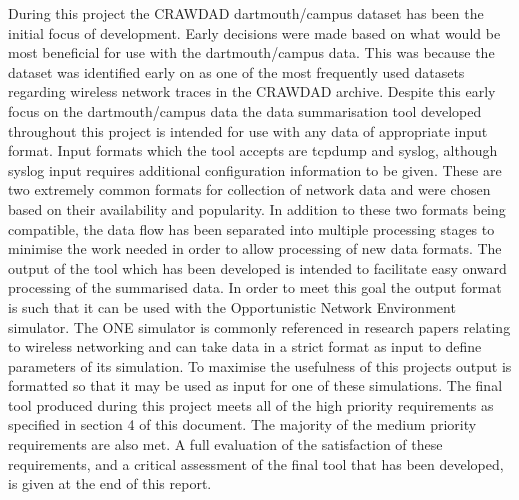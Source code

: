 During this project the CRAWDAD dartmouth/campus dataset \cite{dartmouthcampus2009} has been the initial focus of development. Early decisions were made based on what would be most beneficial for use with the dartmouth/campus data. This was because the dataset was identified early on as one of the most frequently used datasets regarding wireless network traces in the CRAWDAD archive. Despite this early focus on the dartmouth/campus data the data summarisation tool developed throughout this project is intended for use with any data of appropriate input format. Input formats which the tool accepts are tcpdump and syslog, although syslog input requires additional configuration information to be given. These are two extremely common formats for collection of network data and were chosen based on their availability and popularity. In addition to these two formats being compatible, the data flow has been separated into multiple processing stages to minimise the work needed in order to allow processing of new data formats.
The output of the tool which has been developed is intended to facilitate easy onward processing of the summarised data. In order to meet this goal the output format is such that it can be used with the Opportunistic Network Environment simulator. The ONE simulator is commonly referenced in research papers relating to wireless networking and can take data in a strict format as input to define parameters of its simulation. To maximise the usefulness of this projects output is formatted so that it may be used as input for one of these simulations.
The final tool produced during this project meets all of the high priority requirements as specified in section 4 of this document. The majority of the medium priority requirements are also met. A full evaluation of the satisfaction of these requirements, and a critical assessment of the final tool that has been developed, is given at the end of this report.
